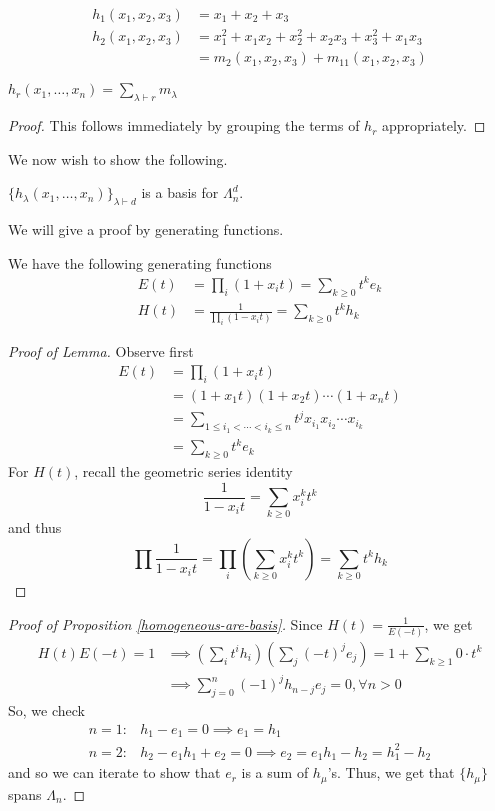 \documentclass[11pt,leqno,oneside]{amsart}
\numberwithin{thm}{section}
\newcommand{\partitionof}{\vdash}
\newcommand{\sym}{\Lambda}
\begin{document}
\begin{example}
  \begin{align*}
    h_1(x_1,x_2,x_3) & = x_1 + x_2 + x_3 \\
    h_2(x_1,x_2,x_3) & = x_1^2 + x_1x_2 + x_2^2 + x_2x_3 + x_3^2 +
                       x_1x_3\\
    & = m_2(x_1,x_2,x_3) + m_{11}(x_1,x_2,x_3)
  \end{align*}
\end{example}
\begin{prop}
  \(h_r(x_1, \ldots, x_n) = \sum_{\lambda \partitionof r} m_\lambda\)
\end{prop}
\begin{proof}
  This follows immediately by grouping the terms of \(h_r\)
  appropriately. 
\end{proof}
We now wish to show the following.
\begin{prop}\label{homogeneous-are-basis}
  \(\{h_\lambda(x_1,\ldots,x_n)\}_{\lambda \partitionof d}\) is a
  basis for \(\sym_n^d\).
\end{prop}
We will give a proof by generating functions. 
\begin{lem}
  We have the following generating functions
  \begin{align*}
    E(t) & = \prod_i (1+x_i t) = \sum_{k \geq 0} t^k e_k \\
    H(t) & = \frac{1}{\prod_i (1-x_i t)} = \sum_{k \geq 0} t^k h_k
  \end{align*}
\end{lem}
\begin{proof}[Proof of Lemma]
  Observe first
  \begin{align*}
    E(t) & = \prod_i (1+x_i t) \\
         & = (1+x_1 t)(1+x_2 t) \cdots (1+x_n t) \\
    & = \sum_{1 \leq i_1 < \cdots < i_k \leq n} t^j x_{i_1} x_{i_2}
      \cdots x_{i_k} \\
    & = \sum_{k \geq 0} t^k e_k
  \end{align*}
  For \(H(t)\), recall the geometric series identity \[
    \frac{1}{1-x_i t} = \sum_{k \geq 0} x_i^k t^k
  \]
  and thus \[
    \prod \frac{1}{1-x_i t} = \prod_i \left( \sum_{k \geq 0} x_i^k t^k
    \right) = \sum_{k \geq 0} t^k h_k
  \]
\end{proof}
\begin{proof}[Proof of Proposition \ref{homogeneous-are-basis}]
  Since \(H(t) = \frac{1}{E(-t)}\), we get
  \begin{align*}
    H(t)E(-t) = 1
    & \implies \left(\sum_i t^i h_i\right)\left( \sum_j (-t)^j e_j
      \right) = 1 + \sum_{k \geq 1} 0 \cdot t^k \\
    & \implies \sum_{j = 0}^n (-1)^j h_{n-j} e_j = 0, \forall n > 0
  \end{align*}
  So, we check
  \begin{align*}
    n=1\colon & h_1-e_1 = 0 \implies e_1 = h_1 \\
    n=2\colon & h_2-e_1 h_1 + e_2 = 0 \implies e_2 = e_1 h_1 - h_2 = h_1^2-h_2
  \end{align*}
  and so we can iterate to show that \(e_r\) is a sum of
  \(h_\mu\)'s. Thus, we get that \(\{h_\mu\}\) spans \(\sym_n\).
\end{proof}
\end{document}

